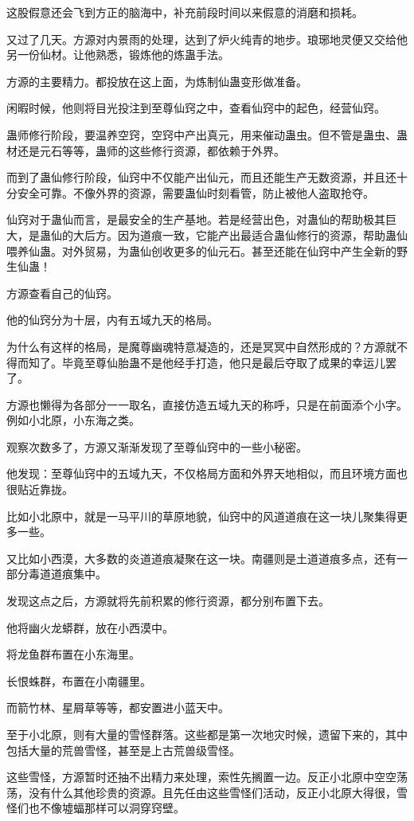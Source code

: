 \begin{this_body}
这股假意还会飞到方正的脑海中，补充前段时间以来假意的消磨和损耗。

又过了几天。方源对内景雨的处理，达到了炉火纯青的地步。琅琊地灵便又交给他另一份仙材。让他熟悉，锻炼他的炼蛊手法。

方源的主要精力。都投放在这上面，为炼制仙蛊变形做准备。

闲暇时候，他则将目光投注到至尊仙窍之中，查看仙窍中的起色，经营仙窍。

蛊师修行阶段，要温养空窍，空窍中产出真元，用来催动蛊虫。但不管是蛊虫、蛊材还是元石等等，蛊师的这些修行资源，都依赖于外界。

而到了蛊仙修行阶段，仙窍中不仅能产出仙元，而且还能生产无数资源，并且还十分安全可靠。不像外界的资源，需要蛊仙时刻看管，防止被他人盗取抢夺。

仙窍对于蛊仙而言，是最安全的生产基地。若是经营出色，对蛊仙的帮助极其巨大，是蛊仙的大后方。因为道痕一致，它能产出最适合蛊仙修行的资源，帮助蛊仙喂养仙蛊。对外贸易，为蛊仙创收更多的仙元石。甚至还能在仙窍中产生全新的野生仙蛊！

方源查看自己的仙窍。

他的仙窍分为十层，内有五域九天的格局。

为什么有这样的格局，是魔尊幽魂特意凝造的，还是冥冥中自然形成的？方源就不得而知了。毕竟至尊仙胎蛊不是他经手打造，他只是最后夺取了成果的幸运儿罢了。

方源也懒得为各部分一一取名，直接仿造五域九天的称呼，只是在前面添个小字。例如小北原，小东海之类。

观察次数多了，方源又渐渐发现了至尊仙窍中的一些小秘密。

他发现：至尊仙窍中的五域九天，不仅格局方面和外界天地相似，而且环境方面也很贴近靠拢。

比如小北原中，就是一马平川的草原地貌，仙窍中的风道道痕在这一块儿聚集得更多一些。

又比如小西漠，大多数的炎道道痕凝聚在这一块。南疆则是土道道痕多点，还有一部分毒道道痕集中。

发现这点之后，方源就将先前积累的修行资源，都分别布置下去。

他将幽火龙蟒群，放在小西漠中。

将龙鱼群布置在小东海里。

长恨蛛群，布置在小南疆里。

而箭竹林、星屑草等等，都安置进小蓝天中。

至于小北原，则有大量的雪怪群落。这些都是第一次地灾时候，遗留下来的，其中包括大量的荒兽雪怪，甚至是上古荒兽级雪怪。

这些雪怪，方源暂时还抽不出精力来处理，索性先搁置一边。反正小北原中空空荡荡，没有什么其他珍贵的资源。且先任由这些雪怪们活动，反正小北原大得很，雪怪们也不像墟蝠那样可以洞穿窍壁。


\end{this_body}

